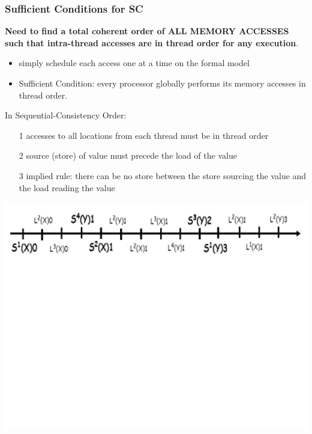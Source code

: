 \documentclass{beamer}
\renewcommand{\emph}[1]{\textcolor{structure}{#1}}
\newcommand{\emp}[1]{\textcolor{DikuRed}{ #1}}
\begin{document}
\begin{frame}[fragile,t]
\frametitle{Sufficient Conditions for SC}

\emp{\bf Need to find a total coherent order of ALL MEMORY
ACCESSES such that intra-thread accesses are in thread order 
for any execution}.
\begin{itemize}
    \item simply schedule each access one at a time on the formal model
    \item \emph{Sufficient Condition:} every processor globally performs
                its memory accesses in thread order.
\end{itemize}
\bigskip

In Sequential-Consistency Order:
\begin{itemize}
    \item[1] accesses to all locations from each thread must be in thread order
    \item[2] source (store) of value must precede the load of the value
    \item[3] implied rule: there can be no store between the store sourcing the 
                value and the load reading the value
\end{itemize}

\includegraphics[width=59ex]{Ch7Figs/EqSeqConst}

\end{frame}
\end{document}
